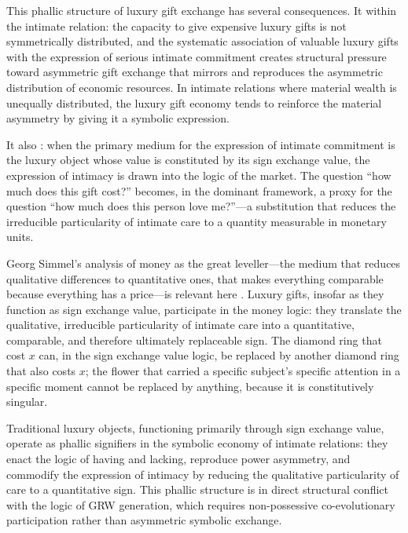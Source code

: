 This phallic structure of luxury gift exchange has several consequences. It  within the intimate relation: the capacity to give expensive luxury gifts is not symmetrically distributed, and the systematic association of valuable luxury gifts with the expression of serious intimate commitment creates structural pressure toward asymmetric gift exchange that mirrors and reproduces the asymmetric distribution of economic resources. In intimate relations where material wealth is unequally distributed, the luxury gift economy tends to reinforce the material asymmetry by giving it a symbolic expression.

It also : when the primary medium for the expression of intimate commitment is the luxury object whose value is constituted by its sign exchange value, the expression of intimacy is drawn into the logic of the market. The question ``how much does this gift cost?'' becomes, in the dominant framework, a proxy for the question ``how much does this person love me?''---a substitution that reduces the irreducible particularity of intimate care to a quantity measurable in monetary units.

Georg Simmel's analysis of money as the great leveller---the medium that reduces qualitative differences to quantitative ones, that makes everything comparable because everything has a price---is relevant here \parencite{simmel1978}. Luxury gifts, insofar as they function as sign exchange value, participate in the money logic: they translate the qualitative, irreducible particularity of intimate care into a quantitative, comparable, and therefore ultimately replaceable sign. The diamond ring that cost $x$ can, in the sign exchange value logic, be replaced by another diamond ring that also costs $x$; the flower that carried a specific subject's specific attention in a specific moment cannot be replaced by anything, because it is constitutively singular.

\begin{claim}
Traditional luxury objects, functioning primarily through sign exchange value, operate as phallic signifiers in the symbolic economy of intimate relations: they enact the logic of having and lacking, reproduce power asymmetry, and commodify the expression of intimacy by reducing the qualitative particularity of care to a quantitative sign. This phallic structure is in direct structural conflict with the logic of GRW generation, which requires non-possessive co-evolutionary participation rather than asymmetric symbolic exchange.
\end{claim}

